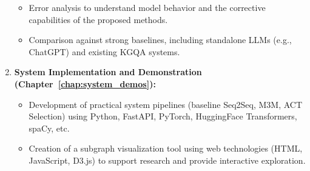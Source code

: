 \begin{enumerate}
\begin{itemize}
        \item Error analysis to understand model behavior and the corrective capabilities of the proposed methods.
        \item Comparison against strong baselines, including standalone LLMs (e.g., ChatGPT) and existing KGQA systems.
    \end{itemize}
    \item \textbf{System Implementation and Demonstration (Chapter~\ref{chap:system_demos}):}
    \begin{itemize}
        \item Development of practical system pipelines (baseline Seq2Seq, M3M, ACT Selection) using Python, FastAPI, PyTorch, HuggingFace Transformers, spaCy, etc.
        \item Creation of a subgraph visualization tool using web technologies (HTML, JavaScript, D3.js) to support research and provide interactive exploration.
    \end{itemize}
\end{enumerate}

